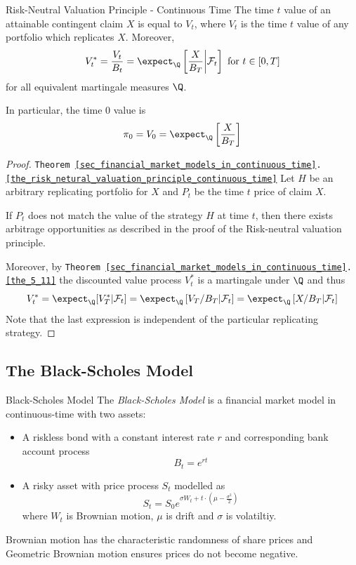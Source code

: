 \documentclass[11pt,a4paper]{article}
\begin{document}
  \begin{theorem}{Risk-Neutral Valuation Principle - Continuous Time}\label{the_risk_netural_valuation_principle_continuous_time}
    The time $t$ value of an attainable contingent claim $X$ is equal to $V_t$, where $V_t$ is the time $t$ value of any portfolio which replicates $X$. Moreover,
    \[ V_t^*=\frac{V_t}{B_t}=\expect_\Q\left[\frac{X}{B_T}\bigg|\mathcal{F}_t\right]\text{ for }t\in[0,T] \]
    for all equivalent martingale measures $\Q$.
    \par In particular, the time $0$ value is
    \[ \pi_0=V_0=\expect_\Q\left[\frac{X}{B_T}\right] \]
  \end{theorem}

  \begin{proof}{\texttt{Theorem \ref{sec_financial_market_models_in_continuous_time}.\ref{the_risk_netural_valuation_principle_continuous_time}}}
    Let $H$ be an arbitrary replicating portfolio for $X$ and $P_t$ be the time $t$ price of claim $X$.
    \par If $P_t$ does not match the value of the strategy $H$ at time $t$, then there exists arbitrage opportunities as described in the proof of the Risk-neutral valuation principle.
    \par Moreover, by \texttt{Theorem \ref{sec_financial_market_models_in_continuous_time}.\ref{the_5_11}} the discounted value process $V_t^*$ is a martingale under $\Q$ and thus
    \[ V_t^*=\expect_\Q[V_T^*|\mathcal{F}_t]=\expect_\Q\left[V_T/B_T|\mathcal{F}_t\right]=\expect_\Q\left[X/B_T|\mathcal{F}_t\right] \]
    Note that the last expression is independent of the particular replicating strategy.\proved
  \end{proof}

\subsection{The Black-Scholes Model}

  \begin{definition}{Black-Scholes Model}
    The \textit{Black-Scholes Model} is a financial market model in continuous-time with two assets:
    \begin{itemize}
      \item A riskless bond with a constant interest rate $r$ and corresponding bank account process
      \[ B_t=e^{rt} \]
      \item A risky asset with price process $S_t$ modelled as
      \[ S_t=S_0e^{\sigma W_t+t\cdot\left(\mu-\frac{\sigma^2}2\right)} \]
      where $W_t$ is Brownian motion, $\mu$ is drift and $\sigma$ is volatiltiy.
    \end{itemize}
    Brownian motion has the characteristic randomness of share prices and Geometric Brownian motion ensures prices do not become negative.
  \end{definition}
\end{document}
